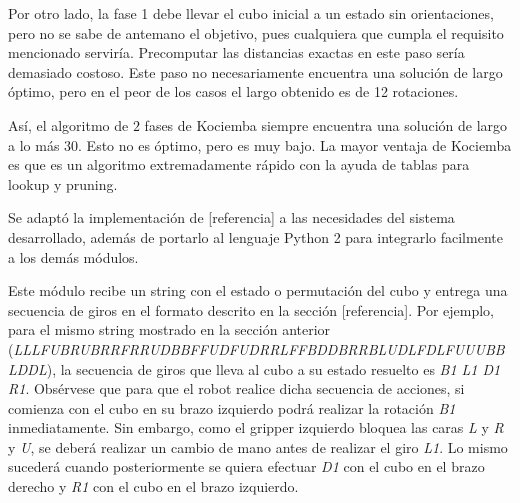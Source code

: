 Por otro lado, la fase 1 debe llevar el cubo inicial a un estado sin orientaciones, pero no se sabe de antemano el objetivo, pues cualquiera que cumpla el requisito mencionado serviría. Precomputar las distancias exactas en este paso sería demasiado costoso. Este paso no necesariamente encuentra una solución de largo óptimo, pero en el peor de los casos el largo obtenido es de 12 rotaciones.

Así, el algoritmo de $2$ fases de Kociemba siempre encuentra una solución de largo a lo más $30$. Esto no es óptimo, pero es muy bajo. La mayor ventaja de Kociemba es que es un algoritmo extremadamente rápido con la ayuda de tablas para lookup y pruning.

Se adaptó la implementación de [referencia] a las necesidades del sistema desarrollado, además de portarlo al lenguaje Python 2 para integrarlo facilmente a los demás módulos.

Este módulo recibe un string con el estado o permutación del cubo y entrega una secuencia de giros en el formato descrito en la sección [referencia]. Por ejemplo, para el mismo string mostrado en la sección anterior (\textit{LLLFUBRUBRRFRRUDBBFFUDFUDRRLFFBDDBRRBLUDLFDLFUUUBBLDDL}), la secuencia de giros que lleva al cubo a su estado resuelto es \textit{B1 L1 D1 R1}. Obsérvese que para que el robot realice dicha secuencia de acciones, si comienza con el cubo en su brazo izquierdo podrá realizar la rotación \textit{B1} inmediatamente. Sin embargo, como el gripper izquierdo bloquea las caras \textit{L} y \textit{R} y \textit{U}, se deberá realizar un cambio de mano antes de realizar el giro \textit{L1}. Lo mismo sucederá cuando posteriormente se quiera efectuar \textit{D1} con el cubo en el brazo derecho y \textit{R1} con el cubo en el brazo izquierdo.


